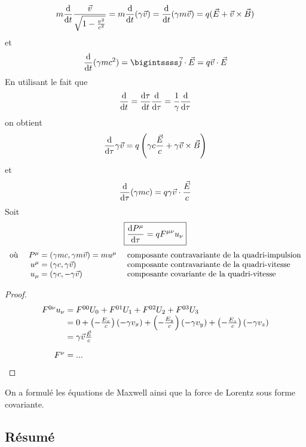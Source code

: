 $$
	m\frac{\mathrm{d}}{\mathrm{d} t}\frac{\vec{v}}{\sqrt{1-\frac{v^2}{c^2}}}=m\frac{\mathrm{d} }{\mathrm{d} t}(\gamma\vec{v})=\frac{\mathrm{d} }{\mathrm{d} t}(\gamma m \vec{v})=q(\vec{E}+\vec{v}\times\vec{B})
$$
et
$$
	\frac{\dif}{\dif t}(\gamma m c^2)=\bigintssss\vec{j}\cdot\vec{E}=q\vec{v}\cdot\vec{E}
$$
En utilisant le fait que
$$
	\frac{\mathrm{d}}{\mathrm{d} t}=\frac{\mathrm{d}\tau}{\mathrm{d} t}\frac{\mathrm{d}}{\mathrm{d}\tau}=\frac{1}{\gamma}\frac{\mathrm{d}}{\mathrm{d}\tau}\\
$$
on obtient
$$
	\frac{\mathrm{d}}{\mathrm{d}\tau}\gamma\vec{v}=q\left(\gamma c\frac{\vec{E}}{c}+\gamma\vec{v}\times\vec{B}\right)
$$
et
$$
	\frac{\mathrm{d}}{\mathrm{d}\tau}(\gamma mc)=q\gamma\vec{v}\cdot\frac{\vec{E}}{c}
$$
Soit
$$
	\boxed{\frac{\mathrm{d} P^\mu}{\mathrm{d}\tau}=qF^{\mu\nu}u_\nu}
$$
{\renewcommand*{\arraystretch}{1.2}
$$
	\begin{array}{lr@{\;}ll}
		\text{o\`u }&P^\mu&=(\gamma mc,\gamma m\vec{v})=mu^\mu&\text{ composante contravariante de la quadri-impulsion}\\
		&u^\mu&=(\gamma c,\gamma\vec{v})&\text{ composante contravariante de la quadri-vitesse}\\
		&u_\mu&=(\gamma c,-\gamma\vec{v})&\text{ composante covariante de la quadri-vitesse}
	\end{array}
$$}

\begin{proof}
$$
	\begin{array}{r@{\;}l}
		F^{0\nu}u_\nu&=F^{00}U_0+F^{01}U_1+F^{02}U_2+F^{03}U_3\\
			&=0+\left(-\frac{E_x}{c}\right)(-\gamma v_x)+\left(-\frac{E_y}{c}\right)(-\gamma v_y)+\left(-\frac{E_z}{c}\right)(-\gamma v_z)\\
			&=\gamma\vec{v}\frac{\vec{E}}{c}\\[10pt]
		F^{\nu}&=...
	\end{array}
$$
\end{proof}

\begin{conc}
On a formulé les équations de Maxwell ainsi que la force de Lorentz sous forme covariante.
\end{conc}

\subsection{Résumé}

